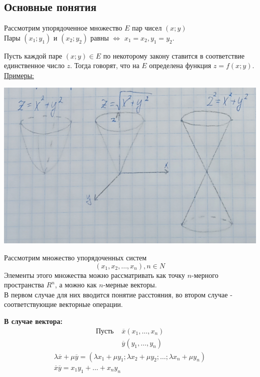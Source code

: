 \documentclass[12pt]{article}
\begin{document}
    \subsection{Основные понятия}
    Рассмотрим упорядоченное множество $E$ пар чисел $(x; y)$\\
    Пары $(x_1; y_1)$ и $(x_2; y_2)$ равны $\Leftrightarrow$ $x_1 = x_2, y_1 = y_2$.\par\noindent
    Пусть каждой паре $(x; y) \in E$ по некоторому закону ставится в соответствие единственное число $z$. Тогда говорят, что на $E$ определена функция $z = f(x; y)$.\\
    \underline{Примеры:}
    \begin{center}
        \includegraphics{7.1.1.png}
    \end{center}
    Рассмотрим множество упорядоченных систем
    \[ (x_1, x_2, \dots, x_n), n \in N \]
    Элементы этого множества можно рассматривать как точку $n$-мерного пространства $R^n$, а можно как $n$-мерные векторы.\\
    В первом случае для них вводится понятие расстояния, во втором случае - соответствующие векторные операции.\par\noindent
    \textbf{В случае вектора:}
    \begin{align*}
        \text{Пусть }&\overline{x} (x_1, \dots, x_n)\\
        &\overline{y}(y_1,\dots,y_n)
    \end{align*}
    \begin{gather*}
        \lambda\overline{x} + \mu \overline{y} = (\lambda x_1 + \mu y_1; \lambda x_2 + \mu y_2; \dots; \lambda x_n + \mu y_n)\\
        \overline{x}\overline{y} = x_1y_1 + \dots + x_ny_n
    \end{gather*}
\end{document}
